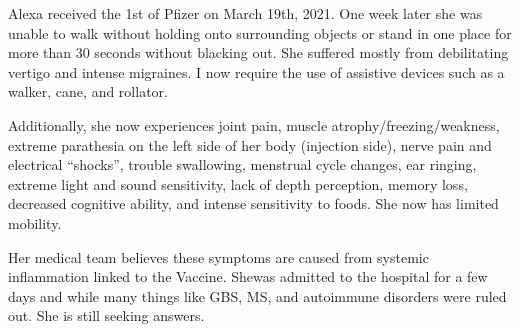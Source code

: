 Alexa received the 1st of Pfizer on March 19th, 2021. One week later she was
unable to walk without holding onto surrounding objects or stand in one place
for more than 30 seconds without blacking out. She suffered mostly from
debilitating vertigo and intense migraines. I now require the use of assistive
devices such as a walker, cane, and rollator.

Additionally, she now experiences joint pain, muscle atrophy/freezing/weakness,
extreme parathesia on the left side of her body (injection side), nerve pain and
electrical “shocks”, trouble swallowing, menstrual cycle changes, ear ringing,
extreme light and sound sensitivity, lack of depth perception, memory loss,
decreased cognitive ability, and intense sensitivity to foods. She now has
limited mobility.

Her medical team believes these symptoms are caused from systemic inflammation
linked to the Vaccine. Shewas admitted to the hospital for a few days and while
many things like GBS, MS, and autoimmune disorders were ruled out. She is still
seeking answers.


